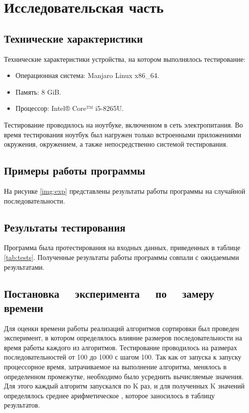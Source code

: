 \chapter{Исследовательская часть}

\section{Технические характеристики}

Технические характеристики устройства, на котором выполнялось тестирование:

\begin{itemize}
	\item Операционная система: Manjaro \cite{manjaro} Linux x86\_64.
	\item Память: 8 GiB.
	\item Процессор: Intel® Core™ i5-8265U\cite{intel}.
\end{itemize}

Тестирование проводилось на ноутбуке, включенном в сеть электропитания. Во
время тестирования ноутбук был нагружен только встроенными приложениями
окружения, окружением, а также непосредственно системой тестирования.

\section{Примеры работы программы}

На рисунке \ref{img:exp} представлены результаты работы программы на случайной
последовательности.


\section{Результаты тестирования}

Программа была протестирования на входных данных, приведенных в таблице
\ref{tab:tests}. Полученные результаты работы программы совпали с ожидаемыми
результатами.

\section[Постановка эксперимента по замеру времени]
        {Постановка ~~эксперимента ~~по ~~замеру времени}

Для оценки времени работы реализаций алгоритмов сортировки был проведен эксперимент, в котором определялось влияние размеров последовательности на время работы каждого из алгоритмов. Тестирование проводилось на размерах последовательностей от 100 до 1000 с шагом 100. Так как от запуска к запуску процессорное время, затрачиваемое на выполнение алгоритма, менялось в определенном промежутке, необходимо было усреднить вычисляемые значения. Для этого каждый алгоритм запускался по K раз, и для полученных K значений определялось среднее арифметическое , которое заносилось в таблицу результатов.

